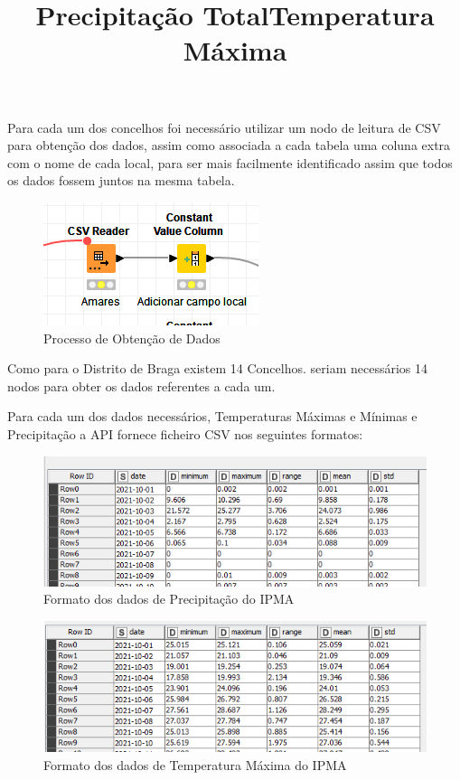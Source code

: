 Para cada um dos concelhos foi necessário utilizar um nodo de leitura de CSV para obtenção dos dados, assim como associada a cada tabela uma coluna extra com o nome de cada local, para ser mais facilmente identificado assim que todos os dados fossem juntos na mesma tabela.

\begin{figure}[H]
    \centering
    \includegraphics{imagens/nodoBuscaCsv.png}
    \caption{Processo de Obtenção de Dados}
\end{figure}


Como para o Distrito de Braga existem 14 Concelhos. seriam necessários 14 nodos para obter os dados referentes a cada um.

Para cada um dos dados necessários, Temperaturas Máximas e Mínimas e Precipitação a API fornece ficheiro CSV nos seguintes formatos:

\newpage
\title{\textbf{Precipitação Total}}


\begin{figure}[H]
    \centering
    \includegraphics[scale=0.7]{imagens/PrecipitaFormatIPMA.png}
    \caption{Formato dos dados de Precipitação do IPMA}
\end{figure}

\title{\textbf{Temperatura Máxima}}

\begin{figure}[H]
    \centering
    \includegraphics[scale=0.7]{imagens/TempMaxFormatIPMA.png}
    \caption{Formato dos dados de Temperatura Máxima do IPMA}
\end{figure}


